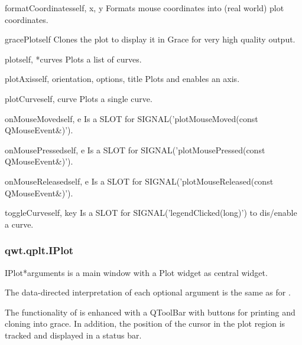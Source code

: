 \documentclass{manual}
\begin{document}
\begin{methoddesc}[Plot]{formatCoordinates}{self, x, y}
Formats mouse coordinates into (real world) plot coordinates.
\end{methoddesc}

\begin{methoddesc}[Plot]{gracePlot}{self}
Clones the plot to display it in Grace for very high quality output.
\end{methoddesc}

\begin{methoddesc}[Plot]{plot}{self, *curves}
Plots a list of curves.
\end{methoddesc}

\begin{methoddesc}[Plot]{plotAxis}{self, orientation, options, title}
Plots and enables an axis.
\end{methoddesc}

\begin{methoddesc}[Plot]{plotCurve}{self, curve}
Plots a single curve.
\end{methoddesc}

\begin{methoddesc}[Plot]{onMouseMoved}{self, e}
Is a SLOT for SIGNAL('plotMouseMoved(const QMouseEvent\&)').
\end{methoddesc}

\begin{methoddesc}[Plot]{onMousePressed}{self, e}
Is a SLOT for SIGNAL('plotMousePressed(const QMouseEvent\&)'). 
\end{methoddesc}

\begin{methoddesc}[Plot]{onMouseReleased}{self, e}
Is a SLOT for SIGNAL('plotMouseReleased(const QMouseEvent\&)').
\end{methoddesc}

\begin{methoddesc}[Plot]{toggleCurve}{self, key}
Is a SLOT for SIGNAL('legendClicked(long)') to dis/enable a curve.
\end{methoddesc}

\subsubsection{qwt.qplt.IPlot \label{intro-qplt-iplot}}

\begin{classdesc}{IPlot}{*arguments}
   is a main window with a Plot widget as central widget.

  The data-directed interpretation of each optional argument is the
  same as for .

  The functionality of  is enhanced with a QToolBar with
  buttons for printing and cloning into grace.
  In addition, the position of the cursor in the plot region is tracked
  and displayed in a status bar. 
\end{classdesc}
\end{document}
